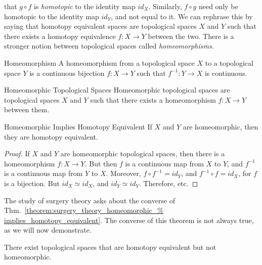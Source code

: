 \documentclass[crop=false,class=book,oneside]{standalone}
\begin{document}
            that $g\circ{f}$ is \textit{homotopic} to the identity map $id_{X}$.
            Similarly, $f\circ{g}$ need only be homotopic to the identity map $id_{Y}$,
            and not equal to it. We can rephrase this by saying that homotopy
            equivalent spaces are topological spaces $X$ and $Y$ such that
            there exists a homotopy equivalence $f:X\rightarrow{Y}$ between
            the two. There is a stronger notion between topological
            spaces called \textit{homeomorphisms}.
            \begin{ldefinition}{Homeomorphism}
                A homeomorphism from a topological space $X$ to a
                topological space $Y$ is a continuous bijection
                $f:{X}\rightarrow{Y}$ such that
                $f^{-1}:{Y}\rightarrow{X}$ is continuous.
            \end{ldefinition}
            \begin{ldefinition}{Homeomorphic Topological Spaces}
                Homeomorphic topological spaces are topological
                spaces $X$ and $Y$ such that there
                exists a homeomorphism
                $f:{X}\rightarrow{Y}$ between them.
            \end{ldefinition}
            \begin{ltheorem}{Homeomorphic Implies Homotopy Equivalent}
                \label{theorem:surgery_theory_homeomorphic_%
                       implies_homotopy_equivalent}
                If $X$ and $Y$ are homeomorphic,
                then they are homotopy equivalent.
            \end{ltheorem}
            \begin{proof}
                If $X$ and $Y$ are homeomorphic topological spaces,
                then there is a homeomorphism $f:X\rightarrow Y$. But then
                $f$ is a continuous map from $X$ to $Y$, and $f^{-1}$ is a
                continuous map from $Y$ to $X$. Moreover,
                ${f}\circ{f^{-1}}=id_{Y}$, and ${f^{-1}}\circ{f}=id_{X}$,
                for $f$ is a bijection. But ${id_{X}}\simeq{id_{X}}$,
                and ${id_{Y}}\simeq{id_{Y}}$. Therefore, etc.
            \end{proof}
            The study of surgery theory asks about the
            converse of Thm.~\ref{theorem:surgery_theory_homeomorphic_%
                                  implies_homotopy_equivalent}.
            The converse of this theorem is not always true,
            as we will now demonstrate.
            \begin{theorem}
                \label{theorem:surgery_theory_homotopic_does_%
                       not_imply_homeomorphic}
                There exist topological spaces that are
                homotopy equivalent but not homeomorphic.
            \end{theorem}
\end{document}
